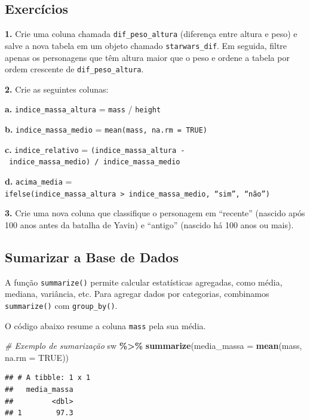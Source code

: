 \documentclass[
]{book}
\newenvironment{Shaded}{\begin{snugshade}}{\end{snugshade}}
\newcommand{\AttributeTok}[1]{\textcolor[rgb]{0.13,0.29,0.53}{#1}}
\newcommand{\CommentTok}[1]{\textcolor[rgb]{0.56,0.35,0.01}{\textit{#1}}}
\newcommand{\ConstantTok}[1]{\textcolor[rgb]{0.56,0.35,0.01}{#1}}
\newcommand{\FunctionTok}[1]{\textcolor[rgb]{0.13,0.29,0.53}{\textbf{#1}}}
\newcommand{\NormalTok}[1]{#1}
\newcommand{\SpecialCharTok}[1]{\textcolor[rgb]{0.81,0.36,0.00}{\textbf{#1}}}
\begin{document}
\subsection{Exercícios}\label{exercuxedcios-18}

\textbf{1.} Crie uma coluna chamada \texttt{dif\_peso\_altura} (diferença entre altura
e peso) e salve a nova tabela em um objeto chamado \texttt{starwars\_dif}. Em
seguida, filtre apenas os personagens que têm altura maior que o peso e
ordene a tabela por ordem crescente de \texttt{dif\_peso\_altura}.

\textbf{2.} Crie as seguintes colunas:

\textbf{a.} \texttt{indice\_massa\_altura} = \texttt{mass} / \texttt{height}

\textbf{b.} \texttt{indice\_massa\_medio} = \texttt{mean(mass,\ na.rm\ =\ TRUE)}

\textbf{c.} \texttt{indice\_relativo} =
\texttt{(indice\_massa\_altura\ -\ indice\_massa\_medio)\ /\ indice\_massa\_medio}

\textbf{d.} \texttt{acima\_media} =
\texttt{ifelse(indice\_massa\_altura\ \textgreater{}\ indice\_massa\_medio,\ “sim”,\ “não”)}

\textbf{3.} Crie uma nova coluna que classifique o personagem em ``recente''
(nascido após 100 anos antes da batalha de Yavin) e ``antigo'' (nascido há
100 anos ou mais).

\subsection{Sumarizar a Base de Dados}\label{sumarizar-a-base-de-dados}

A função \texttt{summarize()} permite calcular estatísticas agregadas, como
média, mediana, variância, etc. Para agregar dados por categorias,
combinamos \texttt{summarize()} com \texttt{group\_by()}.

O código abaixo resume a coluna \texttt{mass} pela sua média.

\begin{Shaded}
\begin{Highlighting}[]
\CommentTok{\# Exemplo de sumarização}
\NormalTok{sw }\SpecialCharTok{\%\textgreater{}\%} \FunctionTok{summarize}\NormalTok{(}\AttributeTok{media\_massa =} \FunctionTok{mean}\NormalTok{(mass, }\AttributeTok{na.rm =} \ConstantTok{TRUE}\NormalTok{))}
\end{Highlighting}
\end{Shaded}

\begin{verbatim}
## # A tibble: 1 x 1
##   media_massa
##         <dbl>
## 1        97.3
\end{verbatim}
\end{document}

